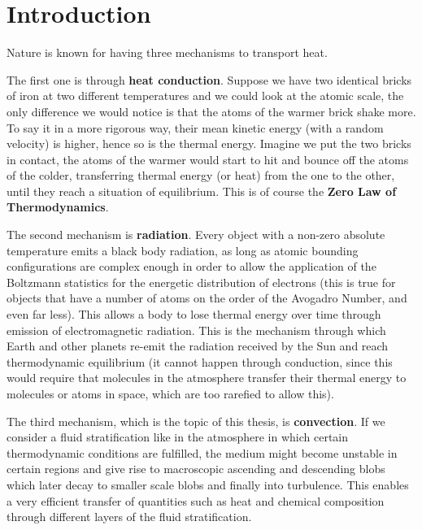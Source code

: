 

\chapter{Introduction}
Nature is known for having three mechanisms to transport heat.  

The first one is through \textbf{heat conduction}. Suppose we have two identical bricks of iron at two different temperatures and we could look at the atomic scale, the only difference we would notice is that the atoms of the warmer brick shake more. To say it in a more rigorous way, their mean kinetic energy (with a random velocity) is higher, hence so is the thermal energy. Imagine we put the two bricks in contact, the atoms of the warmer would start to hit and bounce off the atoms of the colder, transferring thermal energy (or heat) from the one to the other, until they reach a situation of equilibrium. This is of course the \textbf{Zero Law of Thermodynamics}. 

The second mechanism is \textbf{radiation}. Every object with a non-zero absolute temperature emits a black body radiation, as long as atomic bounding configurations are complex enough in order to allow the application of the Boltzmann statistics for the energetic distribution of electrons (this is true for objects that have a number of atoms on the order of the Avogadro Number, and even far less). This allows a body to lose thermal energy over time through emission of electromagnetic radiation. This is the mechanism through which Earth and other planets re-emit the radiation received by the Sun and reach thermodynamic equilibrium (it cannot happen through conduction, since this would require that molecules in the atmosphere transfer their thermal energy to molecules or atoms in space, which are too rarefied to allow this). 

The third mechanism, which is the topic of this thesis, is \textbf{convection}. If we consider a fluid stratification like in the atmosphere in which certain thermodynamic conditions are fulfilled, the medium might become unstable in certain regions and give rise to macroscopic ascending and descending blobs which later decay to smaller scale blobs and finally into turbulence. This enables a very efficient transfer of quantities such as heat and chemical composition through different layers of the fluid stratification. 


